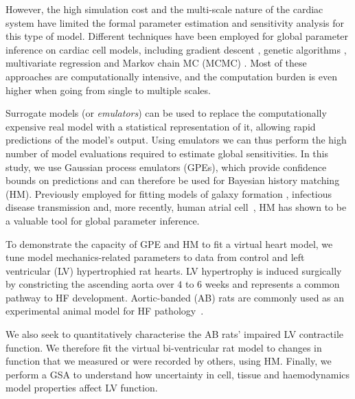 \vspace{0.2cm}
However, the high simulation cost and the multi-scale nature of the cardiac system have limited the formal parameter estimation and sensitivity analysis for this type of model. Different techniques have been employed for global parameter inference on cardiac cell models, including gradient descent \cite{Dokos:2004}, genetic algorithms \cite{Groenendaal:2015}, multivariate regression \cite{Sarkar:2010} and Markov chain MC (\acs{MCMC}) \cite{Johnstone:2016}. Most of these approaches are computationally intensive, and the computation burden is even higher when going from single to multiple scales.

\vspace{0.2cm}
Surrogate models (or \textit{emulators}) can be used to replace the computationally expensive real model with a statistical representation of it, allowing rapid predictions of the model's output. Using emulators we can thus perform the high number of model evaluations required to estimate global sensitivities. In this study, we use Gaussian process emulators (GPEs), which provide confidence bounds on predictions and can therefore be used for Bayesian history matching (HM). Previously employed for fitting models of galaxy formation \cite{Vernon:2010}, infectious disease transmission \cite{Andrianakis:2015} and, more recently, human atrial cell~\cite{Coveney:2018}, HM has shown to be a valuable tool for global parameter inference.

\vspace{0.2cm}
To demonstrate the capacity of GPE and HM to fit a virtual heart model, we tune model mechanics-related parameters to data from control and left ventricular (LV) hypertrophied rat hearts. LV hypertrophy is induced surgically by constricting the ascending aorta over $4$ to $6$ weeks and represents a common pathway to HF development. Aortic-banded (AB) rats are commonly used as an experimental animal model for HF pathology~\cite{Camacho:2016}.

\vspace{0.2cm}
We also seek to quantitatively characterise the AB rats' impaired LV contractile function. We therefore fit the virtual bi-ventricular rat model to changes in function that we measured or were recorded by others, using HM. Finally, we perform a GSA to understand how uncertainty in cell, tissue and haemodynamics model properties affect LV function.



%
%
%
